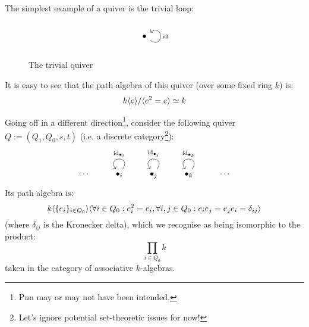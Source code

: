             \begin{example}
                The simplest example of a quiver is the trivial loop:
                    \begin{figure}[H]
                        \centering
                            $$
                                \begin{tikzcd}
                                    \bullet \arrow["\id"', loop, distance=2em, in=35, out=325]
                                \end{tikzcd}
                            $$
                        \caption{The trivial quiver}
                        \label{fig: trivial_quiver}
                    \end{figure}
                It is easy to see that the path algebra of this quiver (over some fixed ring $k$) is:
                    $$k\langle e\rangle/\langle e^2 = e\rangle \simeq k$$
                    
                Going off in a different direction\footnote{Pun may or may not have been intended.}, consider the following quiver $Q := (Q_1, Q_0, s, t)$ (i.e. a discrete category\footnote{Let's ignore potential set-theoretic issues for now!}):
                    $$
                        \begin{tikzcd}
                            \cdots & \bullet_i \arrow["\id_{\bullet_i}"', loop, distance=2em, in=125, out=55] & \bullet_j \arrow["\id_{\bullet_j}"', loop, distance=2em, in=125, out=55] & \bullet_k \arrow["\id_{\bullet_k}"', loop, distance=2em, in=125, out=55] & \cdots
                        \end{tikzcd}
                    $$
                Its path algebra is:
                    $$k\langle\{e_i\}_{i \in Q_0}\rangle\/\langle\forall i \in Q_0: e_i^2 = e_i, \forall i, j \in Q_0: e_i e_j = e_j e_i = \delta_{ij}\rangle$$
                (where $\delta_{ij}$ is the Kronecker delta), which we recognise as being isomorphic to the product:
                    $$\prod_{i \in Q_0} k$$
                taken in the category of associative $k$-algebras.
            \end{example}
